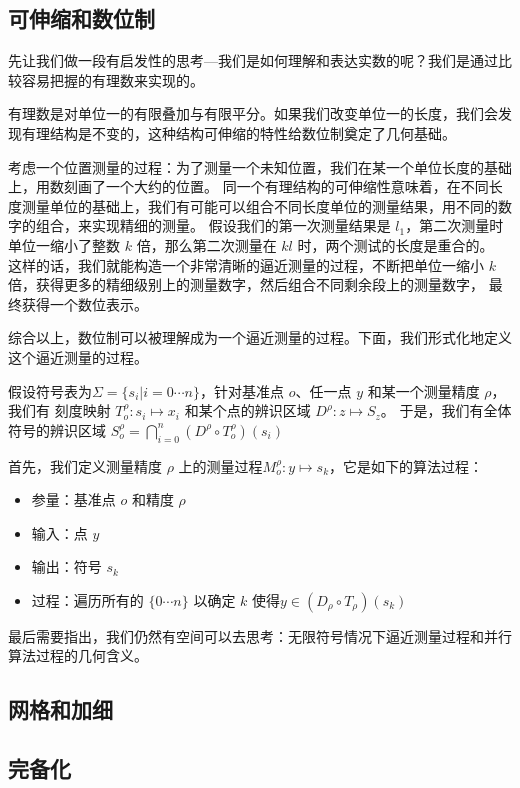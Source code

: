 \documentclass[a4paper,12pt]{article}
\numberwithin{definition}{section}
\numberwithin{lemma}{section}
\numberwithin{proposition}{section}
\numberwithin{theorem}{section}
\numberwithin{grammar}{section}
\numberwithin{program}{section}
\numberwithin{convention}{section}
\numberwithin{corollary}{section}
\begin{document}
\subsection{可伸缩和数位制}

先让我们做一段有启发性的思考—我们是如何理解和表达实数的呢？我们是通过比较容易把握的有理数来实现的。

有理数是对单位一的有限叠加与有限平分。如果我们改变单位一的长度，我们会发现有理结构是不变的，这种结构可伸缩的特性给数位制奠定了几何基础。

考虑一个位置测量的过程：为了测量一个未知位置，我们在某一个单位长度的基础上，用数刻画了一个大约的位置。
同一个有理结构的可伸缩性意味着，在不同长度测量单位的基础上，我们有可能可以组合不同长度单位的测量结果，用不同的数字的组合，来实现精细的测量。
假设我们的第一次测量结果是 $l_1$，第二次测量时单位一缩小了整数 $k$ 倍，那么第二次测量在 $kl$ 时，两个测试的长度是重合的。
这样的话，我们就能构造一个非常清晰的逼近测量的过程，不断把单位一缩小 $k$ 倍，获得更多的精细级别上的测量数字，然后组合不同剩余段上的测量数字，
最终获得一个数位表示。

综合以上，数位制可以被理解成为一个逼近测量的过程。下面，我们形式化地定义这个逼近测量的过程。

假设符号表为$\Sigma = \{s_i | i = 0 \cdots n\}$，针对基准点 $o$、任一点 $y$ 和某一个测量精度 $\rho$，我们有
刻度映射 $T_o^\rho: s_i \mapsto x_i$ 和某个点的辨识区域 $D^\rho: z \mapsto S_z$。
于是，我们有全体符号的辨识区域 $S_o^\rho = \bigcap_{i=0}^n (D^\rho \circ T_o^\rho)(s_i)$

首先，我们定义测量精度 $\rho$ 上的测量过程$M_o^\rho: y \mapsto s_k$，它是如下的算法过程：
\begin{itemize}
    \item 参量：基准点 $o$ 和精度 $\rho$
    \item 输入：点 $y$
    \item 输出：符号 $s_k$
    \item 过程：遍历所有的 $\{0 \cdots n\}$ 以确定 $k$ 使得$y \in (D_\rho \circ T_\rho)(s_k)$
\end{itemize}

最后需要指出，我们仍然有空间可以去思考：无限符号情况下逼近测量过程和并行算法过程的几何含义。

\subsection{网格和加细}

\subsection{完备化}
\end{document}
